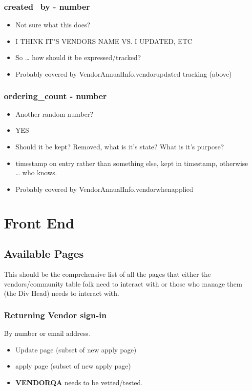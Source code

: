 \documentclass[captions=tablesignature]{scrartcl}
\begin{document}
\subsubsection{created\_by - number}
\label{sec-2-6-1}
\begin{itemize}
\item Not sure what this does?
\item I THINK IT"S VENDORS NAME VS. I UPDATED, ETC
\item So \ldots{} how should it be expressed/tracked?
\item Probably covered by VendorAnnualInfo.vendorupdated tracking (above)
\end{itemize}

\subsubsection{ordering\_count - number}
\label{sec-2-6-2}
\begin{itemize}
\item Another random number?
\item YES
\item Should it be kept?  Removed, what is it's state?  What is it's
purpose?
\item timestamp on entry rather than something else, kept in
timestamp, otherwise \ldots{} who knows.
\item Probably covered by VendorAnnualInfo.vendorwhenapplied
\end{itemize}

\section{Front End}
\label{sec-3}
\subsection{Available Pages}
\label{sec-3-1}
This should be the comprehensive list of all the pages that either
the vendors/community table folk need to interact with or those who
manage them (the Div Head) needs to interact with.
\subsubsection{Returning Vendor sign-in}
\label{sec-3-1-1}
By number or email address.
\begin{itemize}
\item Update page (subset of new apply page)
\item apply page (subset of new apply page)
\end{itemize}
\begin{itemize}
\item {\bfseries\sffamily VENDORQA} needs to be vetted/tested.
\label{sec-3-1-1-1}
\end{itemize}
\end{document}
